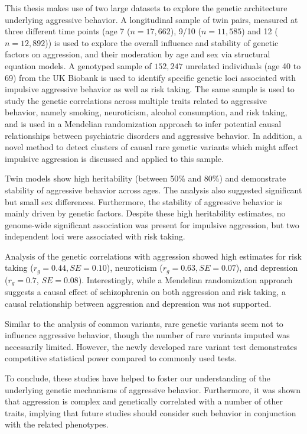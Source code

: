 \documentclass[header.tex]{subfiles}
\begin{document}
This thesis makes use of two large datasets to explore the genetic architecture underlying aggressive behavior.
A longitudinal sample of twin pairs, measured at three different time points (age 7 ($n=17,662$), 9/10 ($n=11,585$) and 12 ($n=12,892$)) is used to explore the overall influence and stability of genetic factors on aggression, and their moderation by  age and sex  via structural equation models.
A genotyped sample of $152,247$ unrelated individuals (age 40 to 69) from the UK Biobank is used to identify specific genetic loci associated with impulsive aggressive behavior as well as risk taking.
The same sample is  used to study the genetic correlations across multiple traits related to aggressive behavior, namely smoking, neuroticism, alcohol consumption, and risk taking, and is used in a Mendelian randomization approach to infer potential causal relationships between psychiatric disorders and aggressive behavior.
In addition, a novel method to detect clusters of causal rare genetic variants which might affect impulsive aggression is discussed and applied to this sample. 

Twin models show high heritability (between 50\% and 80\%) and demonstrate stability of aggressive behavior across ages.
The analysis also suggested significant but small sex differences.
Furthermore, the stability of aggressive behavior is mainly driven by genetic factors.
Despite these high heritability estimates, no genome-wide significant association was present for impulsive aggression, but two independent loci were associated with risk taking.

Analysis of the genetic correlations with aggression showed high estimates for risk taking ($r_g=0.44, SE=0.10$), neuroticism ($r_g=0.63, SE=0.07$), and depression ($r_g=0.7$, $SE=0.08$).
Interestingly, while a Mendelian randomization approach suggests a causal effect of schizophrenia on both aggression and risk taking, a causal relationship between aggression and depression was not supported.

Similar to the analysis of common variants, rare genetic variants seem not to influence aggressive behavior, though the number of rare variants imputed was necessarily limited.
However, the newly developed rare variant test demonstrates competitive statistical power compared to commonly used tests.

To conclude, these studies have helped to foster our understanding of the underlying genetic mechanisms of aggressive behavior.
Furthermore, it was shown that aggression is complex and genetically correlated with a number of other traits,
implying that future studies should consider  such behavior in conjunction with the related phenotypes.     
\end{document}
